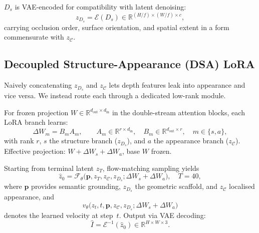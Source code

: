 \documentclass[runningheads]{llncs}
\begin{document}
$D_s$ is VAE-encoded for compatibility with latent denoising:
\begin{equation}
  z_{D_s} = \mathcal{E}(D_s) \in \mathbb{R}^{(H/f) \times (W/f) \times c},
\end{equation}
carrying occlusion order, surface orientation, and spatial extent in a form commensurate with $z_{\mathcal{C}}$.

\subsection{Decoupled Structure-Appearance (DSA) LoRA}
Naively concatenating $z_{D_s}$ and $z_{\mathcal{C}}$ lets depth features leak into appearance and vice versa. We instead route each through a dedicated low-rank module.

For frozen projection $W \in \mathbb{R}^{d_{\mathrm{out}} \times d_{\mathrm{in}}}$ in the double-stream attention blocks, each LoRA branch learns:
\begin{equation}
  \Delta W_m = B_m A_m, \qquad
  A_m \in \mathbb{R}^{r \times d_{\mathrm{in}}}, \quad
  B_m \in \mathbb{R}^{d_{\mathrm{out}} \times r}, \quad
  m \in \{s,a\},
\end{equation}
with rank $r$, $s$ the structure branch ($z_{D_s}$), and $a$ the appearance branch ($z_{\mathcal{C}}$). Effective projection: $W + \Delta W_s + \Delta W_a$, base $W$ frozen.

Starting from terminal latent $z_T$, flow-matching sampling yields
\begin{equation}
  \hat{z}_0 = \mathcal{F}_\theta\bigl(\mathbf{p}, z_T, z_{\mathcal{C}},
  z_{D_s}; \Delta W_s + \Delta W_a\bigr), \quad T{=}40,
\end{equation}
where $\mathbf{p}$ provides semantic grounding, $z_{D_s}$ the
geometric scaffold, and $z_{\mathcal{C}}$ localised appearance, and
\begin{equation}
  v_\theta\bigl(z_t, t, \mathbf{p}, z_{\mathcal{C}}, z_{D_s};
  \Delta W_s + \Delta W_a\bigr)
\end{equation}
denotes the learned velocity at step~$t$. Output via VAE decoding:
\begin{equation}
  \hat{I} = \mathcal{E}^{-1}(\hat{z}_0) \in \mathbb{R}^{H \times W \times 3}.
\end{equation}
\end{document}
